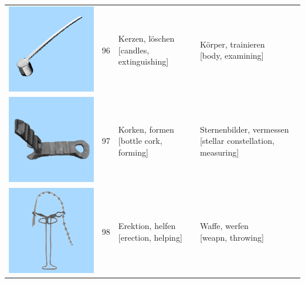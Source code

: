 \documentclass[
  english,
  man,floatsintext]{apa7}
\begin{document}
\begin{center}
\begin{ThreePartTable}
{\begin{longtable}{llll}
\includegraphics[valign=c, scale=0.23]{../materials/unfamiliar/96.png} & 96 & \makecell[l]{Kerzen, löschen\\{[candles, extinguishing]}} & \makecell[l]{Körper, trainieren\\{[body, examining]}}\\
\includegraphics[valign=c, scale=0.23]{../materials/unfamiliar/97.png} & 97 & \makecell[l]{Korken, formen\\{[bottle cork, forming]}} & \makecell[l]{Sternenbilder, vermessen\\{[stellar constellation, measuring]}}\\
\includegraphics[valign=c, scale=0.23]{../materials/unfamiliar/98.png} & 98 & \makecell[l]{Erektion, helfen\\{[erection, helping]}} & \makecell[l]{Waffe, werfen\\{[weapn, throwing]}}\\

\end{longtable}}
\end{ThreePartTable}
\end{center}
\end{document}
